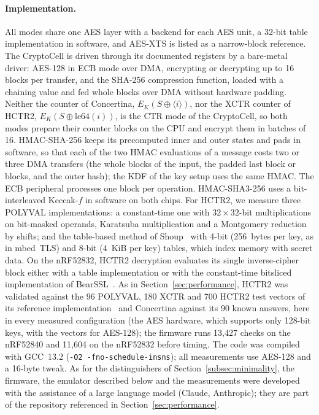 \paragraph{Implementation.}
All modes share one AES layer with a backend for each AES unit, a 32-bit
table implementation in software, and AES-XTS is listed as a narrow-block
reference. The CryptoCell is driven through its documented registers by a
bare-metal driver: AES-128 in ECB mode over DMA, encrypting or decrypting up
to 16 blocks per transfer, and the SHA-256 compression function, loaded with
a chaining value and fed whole blocks over DMA without hardware padding.
Neither the counter of Concertina, $E_K(S \oplus \langle i \rangle)$, nor the
XCTR counter of HCTR2, $E_K(S \oplus \mathrm{le64}(i))$, is the CTR mode of
the CryptoCell, so both modes prepare their counter blocks on the CPU and
encrypt them in batches of 16. HMAC-SHA-256 keeps its precomputed inner and
outer states and pads in software, so that each of the two HMAC evaluations
of a message costs two or three DMA transfers (the whole blocks of the
input, the padded last block or blocks, and the outer hash); the KDF of the
key setup uses the same HMAC. The ECB peripheral
processes one block per operation. HMAC-SHA3-256 uses a bit-interleaved
Keccak-$f$ in software on both chips. For HCTR2, we measure three POLYVAL
implementations: a constant-time one with $32 \times 32$-bit
multiplications on bit-masked operands, Karatsuba multiplication and a
Montgomery reduction by shifts; and the table-based method of
Shoup~\cite{ShoupGCM} with 4-bit (256~bytes per key, as in mbed~TLS) and
8-bit (4~KiB per key) tables, which index memory with secret data. On the
nRF52832, HCTR2 decryption evaluates its single inverse-cipher block either
with a table implementation or with the constant-time bitsliced
implementation of BearSSL~\cite{BearSSL}. As in
Section~\ref{sec:performance}, HCTR2 was validated against the 96 POLYVAL,
180 XCTR and 700 HCTR2 test vectors of its reference
implementation~\cite{HCTR2} and Concertina against its 90 known answers, here
in every measured configuration (the AES hardware, which supports only
128-bit keys, with the vectors for AES-128); the firmware runs
13{,}427 checks on the nRF52840 and 11{,}604 on the nRF52832 before
timing. The code was compiled with GCC~13.2 (\texttt{-O2
-fno-schedule-insns}); all measurements use AES-128 and a 16-byte tweak. As
for the distinguishers of Section~\ref{subsec:minimality}, the firmware, the
emulator described below and the measurements were developed with the
assistance of a large language model (Claude, Anthropic); they are part of
the repository referenced in Section~\ref{sec:performance}.

